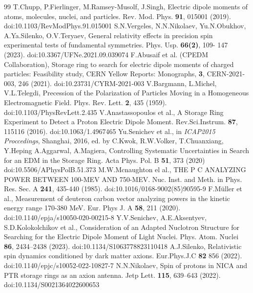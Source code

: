 \documentclass[submitting]{nst}
\begin{document}
\begin{thebibliography} {99}
	 T.Chupp, P.Fierlinger, M.Ramsey-Musolf, J.Singh, Electric dipole moments of atoms, molecules, nuclei, and particles. Rev. Mod. Phys. \textbf{91}, 015001 (2019). doi:10.1103/RevModPhys.91.015001
	 S.N.Vergeles, N.N.Nikolaev, Yu.N.Obukhov, A.Ya.Silenko, O.V.Teryaev, General relativity
	effects in precision spin experimental tests of fundamental symmetries. Phys. Usp. \textbf{66(2)}, 109-
	147 (2023). doi:10.3367/UFNe.2021.09.039074
	 F.Abusaif et al. (CPEDM Collaboration), Storage ring to search for electric dipole moments of charged particles: Feasibility study, CERN Yellow Reports: Monographs, \textbf{3}, CERN-2021-003, 246 (2021). doi:10.23731/CYRM-2021-003
	 V.Bargmann, L.Michel, V.L.Telegdi, Precession of the Polarization of Particles Moving in a Homogeneous Electromagnetic Field. Phys. Rev. Lett. \textbf{2}, 435 (1959). doi:10.1103/PhysRevLett.2.435
	 V.Anastassopoulos et al., A Storage Ring Experiment to Detect a Proton Electric Dipole Moment. Rev.Sci.Instrum. \textbf{87}, 115116 (2016). doi:10.1063/1.4967465
	 Yu.Senichev et al., in \textit{ICAP2015 Proccedings}, Shanghai, 2016, ed. by C.Kwok, R.W.Volker, T.Chuanxiang, Y.Heping
	 A.Aggarwal, A.Magiera, Controlling Systematic Uncertainties in Search for an EDM in the Storage Ring. Acta Phys. Pol. B \textbf{51}, 373 (2020) doi:10.5506/APhysPolB.51.373
	 M.W.Mcnaughton el al., THE P C ANALYZING POWER BETWEEN 100-MEV AND 750-MEV. Nuc. Inst. and Meth. in Phys. Res. Sec. A \textbf{241}, 435-440 (1985). doi:10.1016/0168-9002(85)90595-9
	 F.Müller et al., Measurement of deuteron carbon vector analyzing powers in the kinetic energy range 170-380 MeV. Eur. Phys J. A \textbf{58}, 211 (2020). doi:10.1140/epja/s10050-020-00215-8
	 Y.V.Senichev, A.E.Aksentyev, S.D.Kolokolchikov et al., Consideration of an Adapted Nuclotron Structure for Searching for the Electric Dipole Moment of Light Nuclei. Phys. Atom. Nuclei \textbf{86}, 2434–2438 (2023). doi:10.1134/S1063778823110418
	 A.J.Silenko, Relativistic spin dynamics conditioned by dark matter axions. Eur.Phys.J.C \textbf{82} 856 (2022). doi:10.1140/epjc/s10052-022-10827-7
	 N.N.Nikolaev, Spin of protons in NICA and PTR storage rings as an axion antenna. Jetp Lett. \textbf{115}, 639–643 (2022). doi:10.1134/S0021364022600653

\end{thebibliography}
\end{document}
